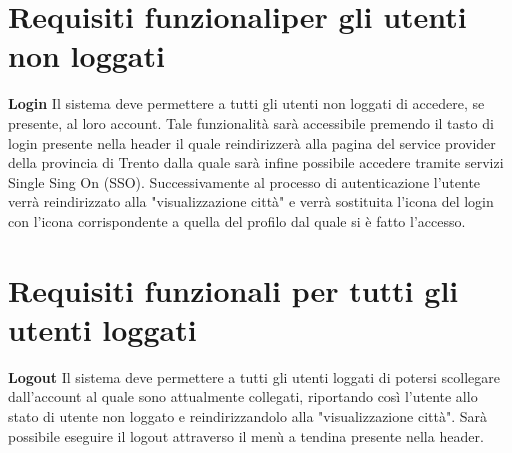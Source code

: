     \section{Requisiti funzionaliper gli utenti non loggati}
        \begin{rfList}
            \rfItem \textbf{Login} Il sistema deve permettere a tutti gli utenti non loggati di accedere, se presente, al loro account. Tale funzionalità sarà accessibile premendo il tasto di login presente nella header il quale reindirizzerà alla pagina del service provider della provincia di Trento dalla quale sarà infine possibile accedere tramite servizi Single Sing On (SSO). Successivamente al processo di autenticazione l'utente verrà reindirizzato alla "visualizzazione città" e verrà sostituita l'icona del login con l'icona corrispondente a quella del profilo dal quale si è fatto l'accesso.
        \end{rfList}
    \section{Requisiti funzionali per tutti gli utenti loggati}
        \begin{rfList}
            \rfItem \textbf{Logout} Il sistema deve permettere a tutti gli utenti loggati di potersi scollegare dall'account al quale sono attualmente collegati, riportando così l'utente allo stato di utente non loggato e reindirizzandolo alla "visualizzazione città". Sarà possibile eseguire il logout attraverso il menù a tendina presente nella header.
        \end{rfList}     
